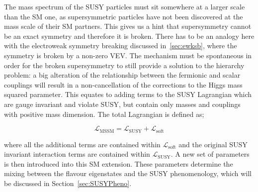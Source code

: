 				The mass spectrum of the \ac{SUSY} particles must sit somewhere at a larger scale than the \ac{SM} one, as supersymmetric particles have not been discovered at the mass scale of their \ac{SM} partners. This gives us a hint that supersymmetry cannot be an exact symmetry and therefore it is broken. There has to be an analogy here with the electroweak symmetry breaking discussed in~\ref{sec:ewksb}, where the symmetry is broken by a non-zero \ac{VEV}. The mechanism must be spontaneous in order for the broken supersymmetry to still provide a solution to the hierarchy problem: a big alteration of the relationship between the fermionic and scalar couplings will result in a non-cancellation of the corrections to the Higgs mass squared parameter.
				This equates to adding terms to the \ac{SUSY} Lagrangian which are gauge invariant and violate \ac{SUSY}, but contain only masses and couplings with positive mass dimension. The total Lagrangian is defined as;

				\begin{equation}
				\label{eq:soft_sb}
					\mathcal L_{\mathrm{MSSM}} = \mathcal {L_{\mathrm{SUSY}}} + \mathcal {L_{\mathrm{soft}}}
				\end{equation}

				\noindent where all the additional terms are contained within $\mathcal {L_{\mathrm{soft}}}$ and the original \ac{SUSY} invariant interaction terms are contained within $\mathcal {L_{\mathrm{SUSY}}}$. A new set of parameters is then introduced into this \ac{SM} extension. These parameters determine the mixing between the flavour eigenstates and the \ac{SUSY} phenomenology, which will be discussed in Section~\ref{sec:SUSYPheno}. 



